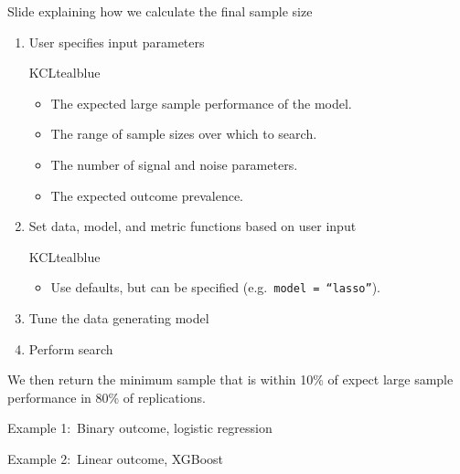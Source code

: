 \documentclass[11pt]{beamer}
\newcommand{\gap}{\vspace{0.8em}}
\begin{document}
\begin{frame}[t]{Slide explaining how we calculate the final sample size}

	\begin{enumerate}
		\item User specifies input parameters
		      \begin{cbox}{KCLtealblue}{}
			      \begin{itemize}
				      \item The expected large sample performance of the
				            model.
				      \item The range of sample sizes over which to search.
				      \item The number of signal and noise parameters.
				      \item The expected outcome prevalence.
			      \end{itemize}
		      \end{cbox}
		\item Set data, model, and metric functions based on user input
		      \begin{cbox}{KCLtealblue}{}
			      \begin{itemize}
				      \item Use defaults, but can be specified (e.g.\
				            \texttt{model = ``lasso''}).
			      \end{itemize}
		      \end{cbox}

		\item Tune the data generating model
		\item Perform search
	\end{enumerate}

	\gap

	We then return the minimum sample that is within 10\% of expect large
	sample performance in 80\% of replications.

\end{frame}

\begin{frame}[t]{Example 1:\ Binary outcome, logistic regression }

\end{frame}

\begin{frame}[t]{Example 2:\ Linear outcome, XGBoost}

\end{frame}
\end{document}
